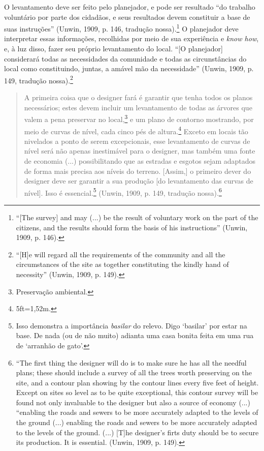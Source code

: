 \documentclass[12pt, a4paper]{book} %
\begin{document}
        O levantamento deve ser feito pelo planejador, e pode ser resultado ``do trabalho voluntário por parte dos cidadãos, e seus resultados devem constituir a base de suas instruções'' (Unwin, 1909, p. 146, tradução nossa).\footnote[37]{``[The survey] and may (...) be the result of voluntary work on the part of the citizens, and the results should form the basis of his instructions'' (Unwin, 1909, p. 146).} O planejador deve interpretar essas informações, recolhidas por meio de sua experiência e \textit{know how}, e, à luz disso, fazer seu próprio levantamento do local. ``[O planejador] considerará todas as necessidades da comunidade e todas as circunstâncias do local como constituindo, juntas, a amável mão da necessidade'' (Unwin, 1909, p. 149, tradução nossa).\footnote[38]{``[H]e will regard all the requirements of the community and all the circumstances of the site as together constituting the kindly hand of necessity'' (Unwin, 1909, p. 149).}

        \begin{quotation}
            A primeira coisa que o designer fará é garantir que tenha todos os planos necessários; estes devem incluir um levantamento de todas as árvores que valem a pena preservar no local,\footnote[39]{Preservação ambiental.} e um plano de contorno mostrando, por meio de curvas de nível, cada cinco pés de altura.\footnote[40]{5ft=1,52m.} Exceto em locais tão nivelados a ponto de serem excepcionais, esse levantamento de curvas de nível será não apenas inestimável para o designer, mas também uma fonte de economia (...) possibilitando que as estradas e esgotos sejam adaptados de forma mais precisa aos níveis do terreno. [Assim,] o primeiro dever do designer deve ser garantir a sua produção [do levantamento das curvas de nível]. Isso é essencial.\footnote[41]{Isso demonstra a importância \textit{basilar} do relevo. Digo `basilar' por estar na base. De nada (ou de não muito) adianta uma casa bonita feita em uma rua de `arranhão de gato'.} (Unwin, 1909, p. 149, tradução nossa).\footnote[42]{``The first thing the designer will do is to make sure he has all the needful plans; these should include a survey of all the trees worth preserving on the site, and a contour plan showing by the contour lines every five feet of height. Except on sites so level as to be quite exceptional, this contour survey will be found not only invaluable to the designer but also a source of economy (...) ``enabling the roads and sewers to be more accurately adapted to the levels of the ground (...) enabling the roads and sewers to be more accurately adapted to the levels of the ground. (...) [T]he designer's firts duty should be to secure its production. It is essential. (Unwin, 1909, p. 149).}
        \end{quotation}
\end{document}
